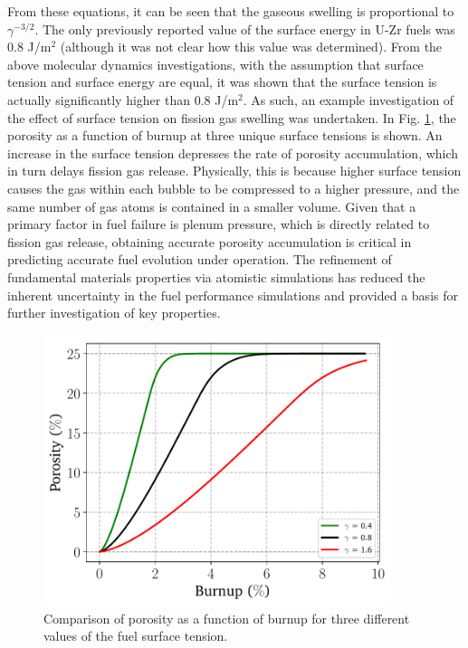\documentclass[review]{elsarticle}
\begin{document}
From these equations, it can be seen that the gaseous swelling is proportional to $\gamma^{-3/2}$. The only previously reported value of the surface energy in U-Zr fuels was 0.8 J/m$^2$ \cite{tsuboi1992} (although it was not clear how this value was determined). From the above molecular dynamics investigations, with the assumption that surface tension and surface energy are equal, it was shown that the surface tension is actually significantly higher than 0.8 J/m$^2$. As such, an example investigation of the effect of surface tension on fission gas swelling was undertaken. In Fig. \ref{fig:plot_porosity_var_gamma}, the porosity as a function of burnup at three unique surface tensions is shown. An increase in the surface tension depresses the rate of porosity accumulation, which in turn delays fission gas release. Physically, this is because higher surface tension causes the gas within each bubble to be compressed to a higher pressure, and the same number of gas atoms is contained in a smaller volume. Given that a primary factor in fuel failure is plenum pressure, which is directly related to fission gas release, obtaining accurate porosity accumulation is critical in predicting accurate fuel evolution under operation. The refinement of fundamental materials properties via atomistic simulations has reduced the inherent uncertainty in the fuel performance simulations and provided a basis for further investigation of key properties. 

\begin{figure}[!htp]
\begin{center}
\includegraphics[keepaspectratio, width=4.0in]{plot_porosity_var_gamma}
\end{center}
\caption{Comparison of porosity as a function of burnup for three different values of the fuel surface tension.}
\label{fig:plot_porosity_var_gamma}
\end{figure}
\end{document}
